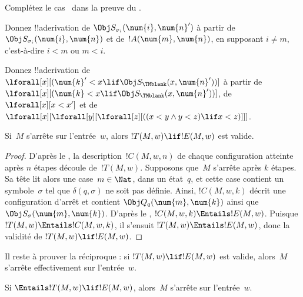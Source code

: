 \documentclass[../../../include/open-logic-section]{subfiles}
\begin{document}
\begin{prob}
Complétez le cas~ dans la preuve du
.
\end{prob}

\begin{prob}
Donnez !!a{derivation} de
$\Obj S_{\sigma_i}(\num{i},\num{n}')$ à partir de
$\Obj S_{\sigma_i}(\num{i},\num{n})$ et de~$!A(\num{m},\num{n})$,
en supposant $i\ne m$, c'est-à-dire $i<m$ ou $m<i$.
\end{prob}

\begin{prob}
Donnez !!a{derivation} de
$\lforall[x][(\num{k}'<x\lif
\Obj S_\TMblank(x,\num{n}'))]$ à partir de
$\lforall[x][(\num{k}<x\lif
\Obj S_\TMblank(x,\num{n}'))]$,
de $\lforall[x][x<x']$ et de
$\lforall[x][\lforall[y][\lforall[z][
((x<y\land y<z)\lif x<z)]]]$.
\end{prob}

\begin{lem}
Si~$M$ s'arrête sur l'entrée~$w$, alors
$!T(M,w)\lif !E(M,w)$ est valide.
\end{lem}

\begin{proof}
D'après le , la description~$!C(M,w,n)$ de
chaque configuration atteinte après $n$ étapes découle de~$!T(M,w)$.
Supposons que~$M$ s'arrête après $k$ étapes. Sa tête lit alors
une case~$m\in\Nat$, dans un état~$q$, et cette case contient
un symbole~$\sigma$ tel que $\delta(q,\sigma)$ ne soit pas
définie. Ainsi, $!C(M,w,k)$ décrit une configuration d'arrêt
et contient $\Obj Q_q(\num{m},\num{k})$ ainsi que
$\Obj S_\sigma(\num{m},\num{k})$. D'après le
,
$!C(M,w,k)\Entails !E(M,w)$. Puisque
$!T(M,w)\Entails !C(M,w,k)$, il s'ensuit
$!T(M,w)\Entails !E(M,w)$, donc la validité de
$!T(M,w)\lif !E(M,w)$.
\end{proof}

\begin{explain}
Il reste à prouver la réciproque : si
$!T(M,w)\lif !E(M,w)$ est valide, alors~$M$ s'arrête
effectivement sur l'entrée~$w$.
\end{explain}

\begin{lem}
Si $\Entails !T(M,w)\lif !E(M,w)$, alors~$M$ s'arrête
sur l'entrée~$w$.
\end{lem}
\end{document}
